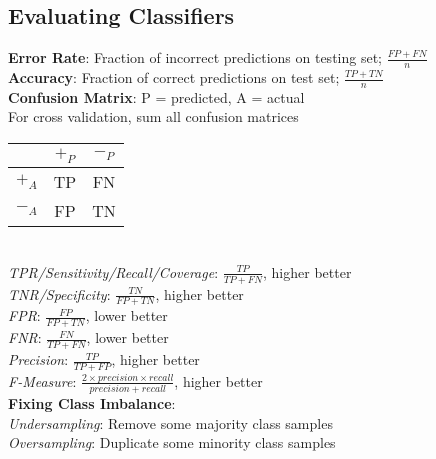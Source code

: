 \documentclass{article}
\begin{document}
\begin{multicols*}{2}
        \subsection*{Evaluating Classifiers}
        \textbf{Error Rate}: Fraction of incorrect predictions on testing set; $\frac{FP + FN}{n}$\\
        \textbf{Accuracy}: Fraction of correct predictions on test set; $\frac{TP + TN}{n}$\\
        \textbf{Confusion Matrix}: P = predicted, A = actual\\
        For cross validation, sum all confusion matrices\\
        \begin{tabular}{c|c|c}
            & $+_P$ & $-_P$ \\
            \hline
            $+_A$ & TP    & FN    \\
            $-_A$ & FP    & TN    \\
        \end{tabular}\\
        \textit{TPR/Sensitivity/Recall/Coverage}: $\frac{TP}{TP + FN}$, higher better\\
        \textit{TNR/Specificity}: $\frac{TN}{FP + TN}$, higher better\\
        \textit{FPR}: $\frac{FP}{FP + TN}$, lower better\\
        \textit{FNR}: $\frac{FN}{TP + FN}$, lower better\\
        \textit{Precision}: $\frac{TP}{TP + FP}$, higher better\\
        \textit{F-Measure}: $\frac{2 \times precision \times recall}{precision + recall}$, higher
        better\\
        \textbf{Fixing Class Imbalance}:\\
        \textit{Undersampling}: Remove some majority class samples\\
        \textit{Oversampling}: Duplicate some minority class samples\\

\end{multicols*}
\end{document}
